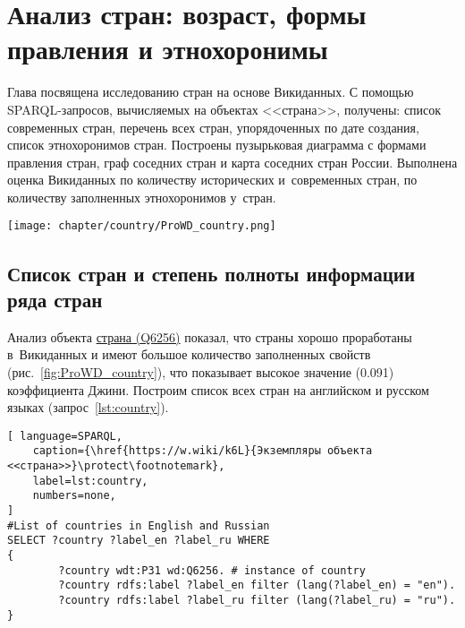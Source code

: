 \chapter{Анализ стран: возраст, формы правления и этнохоронимы}
\label{ch:country}

Глава посвящена исследованию стран на основе Викиданных. 
С помощью SPARQL-запросов, вычисляемых на объектах <<страна>>, получены: 
список современных стран, перечень всех стран, упорядоченных по дате создания, 
список этнохоронимов стран. 
Построены пузырьковая диаграмма с формами правления стран, 
граф соседних стран и карта соседних стран России. 
Выполнена оценка Викиданных по количеству исторических и~современных стран, 
по количеству заполненных этнохоронимов у~стран. 


\begin{marginfigure}[7\baselineskip]
    \texttt{[image: chapter/country/ProWD\_country.png]}
    \caption[Степень заполненности свойств стран на Викиданных]%
	{%
    Высокая степень заполненности свойств стран на Викиданных 
    по данным сервиса ProWD.id на 2020 год
	}%
	\label{fig:ProWD_country}%
\end{marginfigure}


\section{Список стран и степень полноты информации ряда стран}

Анализ объекта \href{https://www.wikidata.org/wiki/Q6256}{страна (Q6256)} 
показал, что страны хорошо проработаны в~Викиданных 
и имеют большое количество заполненных свойств (рис.~\ref{fig:ProWD_country}), 
что показывает высокое значение (0.091) коэффициента Джини. 
Построим список всех стран на английском и русском языках (запрос~\ref{lst:country}).

\begin{lstlisting}[ language=SPARQL, 
    caption={\href{https://w.wiki/k6L}{Экземпляры объекта <<страна>>}\protect\footnotemark},
    label=lst:country, 
    numbers=none,
]
#List of countries in English and Russian
SELECT ?country ?label_en ?label_ru WHERE
{
		?country wdt:P31 wd:Q6256. # instance of country
		?country rdfs:label ?label_en filter (lang(?label_en) = "en").
		?country rdfs:label ?label_ru filter (lang(?label_ru) = "ru").
}
\end{lstlisting}

